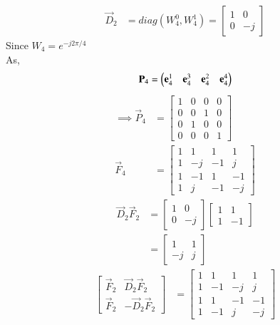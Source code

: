 \documentclass[journal,12pt,twocolumn]{IEEEtran}
\renewcommand\thesection{\arabic{section}}
\begin{document}
\begin{enumerate}[label=\arabic*.,ref=\thesection.\theenumi]
\begin{align}
		\vec{D}_{2}&=diag(W_4^{0},W_4^{1})
		=\begin{bmatrix}
			1&0\\0&-j
		\end{bmatrix}
	\end{align}
Since $W_4= e^{-j2\pi/4}$\\
	As, \begin{align}
		\mathbf{P}_4 = \begin{pmatrix}\mathbf{e}_4^{1} &\mathbf{e}_4^{3} &\mathbf{e}_4^{2} &\mathbf{e}_4^{4} \end{pmatrix}
	\end{align}
	\begin{align}
		\label{eq:p4}
	\implies	\vec{P}_{4}&=
		\begin{bmatrix}
			1&0&0&0\\0&0&1&0\\0&1&0&0\\0&0&0&1
		\end{bmatrix}\\
	   \label{eq:F4}
		\vec{F}_{4}&=
		\begin{bmatrix}
			1&1&1&1\\1&-j&-1&j\\1&-1&1&-1\\1&j&-1&-j
		\end{bmatrix}
	\end{align}
\begin{align}
	\vec{D}_{2}\vec{F}_{2}&=
	\begin{bmatrix}
		1&0\\0&-j
	\end{bmatrix}
	\begin{bmatrix}
		1&1\\1&-1
\end{bmatrix}\\
&=\begin{bmatrix}
	1&1\\-j&j
\end{bmatrix}
\end{align}
	\begin{align}
		\begin{bmatrix}
			\vec{F}_{2} & \vec{D}_{2}\vec{F}_{2} \\
			\vec{F}_{2} & -\vec{D}_{2}\vec{F}_{2}
		\end{bmatrix}&=
		\begin{bmatrix}
			1&1&1&1\\1&-1&-j&j\\1&1&-1&-1\\1&-1&j&-j
		\end{bmatrix}
		\label{eq:d2f2}
	\end{align}

\end{enumerate}
\end{document}
